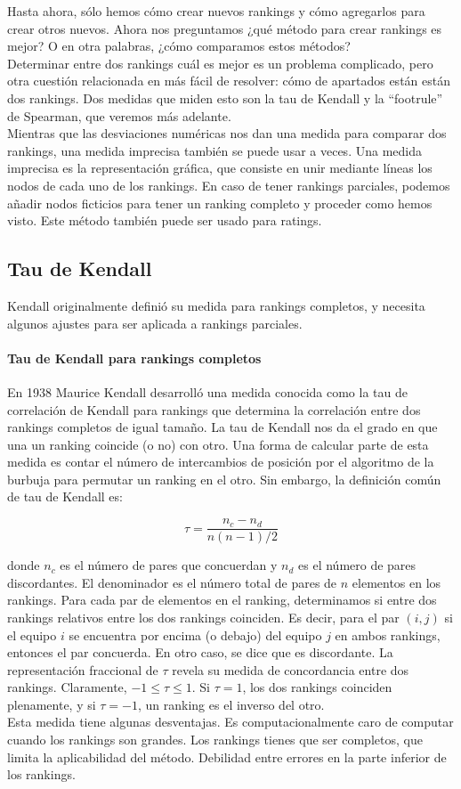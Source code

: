  Hasta ahora, sólo hemos cómo crear nuevos rankings y cómo agregarlos para crear otros nuevos. Ahora nos preguntamos ¿qué método para crear rankings es mejor? O en otra palabras, ¿cómo comparamos estos métodos?\\
 
 Determinar entre dos rankings cuál es mejor es un problema complicado, pero otra cuestión relacionada en más fácil de resolver: cómo de apartados están están dos rankings. Dos medidas que miden esto son la tau de Kendall y la ``footrule'' de Spearman, que veremos más adelante.\\
 
 Mientras que las desviaciones numéricas nos dan una medida para comparar dos rankings, una medida imprecisa también se puede usar a veces. Una medida imprecisa es la representación gráfica, que consiste en unir mediante líneas los nodos de cada uno de los rankings. En caso de tener rankings parciales, podemos añadir nodos ficticios para tener un ranking completo y proceder como hemos visto. Este método también puede ser usado para ratings.
 
 \subsection{Tau de Kendall} 
 
 Kendall originalmente definió su medida para rankings completos, y necesita algunos ajustes para ser aplicada a rankings parciales.
 
 \paragraph{Tau de Kendall para rankings completos}
 
 En 1938 Maurice Kendall desarrolló una medida conocida como la tau de correlación de Kendall para rankings que determina la correlación entre dos rankings completos de igual tamaño. La tau de Kendall nos da el grado en que una un ranking coincide (o no) con otro. Una forma de calcular parte de esta medida es contar el número de intercambios de posición por el algoritmo de la burbuja para permutar un ranking en el otro. Sin embargo, la definición común de tau de Kendall es:
 
 \[ \tau = \dfrac{n_c - n_d}{n(n-1)/2} \]
 
 donde $n_c$ es el número de pares que concuerdan y $n_d$ es el número de pares discordantes. El denominador es el número total de pares de $n$ elementos en los rankings. Para cada par de elementos en el ranking, determinamos si entre dos rankings relativos entre los dos rankings coinciden. Es decir, para el par $(i,j)$ si el equipo $i$ se encuentra por encima (o debajo) del equipo $j$ en ambos rankings, entonces el par concuerda. En otro caso, se dice que es discordante. La representación fraccional de $\tau$ revela su medida de concordancia entre dos rankings.  Claramente, $-1 \leq \tau \leq 1$. Si $\tau = 1$, los dos rankings coinciden plenamente, y si $\tau = -1$, un ranking es el inverso del otro.\\
 
 Esta medida tiene algunas desventajas. Es computacionalmente caro de computar cuando los rankings son grandes. Los rankings tienes que ser completos, que limita la aplicabilidad del método. Debilidad entre errores en la parte inferior de los rankings.